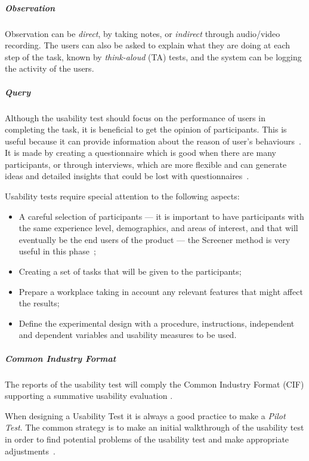 \documentclass[a4paper]{article}
\begin{document}
\subparagraph{Observation} Observation can be \emph{direct}, by taking notes, or \emph{indirect} through audio/video recording. The users can also be asked to explain what they are doing at each step of the task, known by \emph{think-aloud} (TA) tests, and the system can be logging the activity of the users.
  
\subparagraph{Query} Although the usability test should focus on the performance of users in completing the task, it is beneficial to get the opinion of participants. This is useful because it can provide information about the reason of user's behaviours~\citep{mitchell2007step}. It is made by creating a questionnaire which is good when there are many participants, or through interviews, which are more flexible and can generate ideas and detailed insights that could be lost with questionnaires~\citep{lazar2010research}.

Usability tests require special attention to the following aspects:
\begin{itemize}
\item A careful selection of participants --- it is important to have participants with the same experience level, demographics, and areas of interest, and that will eventually be the end users of the product --- the Screener method is very useful in this phase~\citep{mitchell2007step};
\item Creating a set of tasks that will be given to the participants;
\item Prepare a workplace taking in account any relevant features that might affect the results;
\item Define the experimental design with a procedure, instructions, independent and dependent variables and usability measures to be used.
\end{itemize}

\subparagraph{Common Industry Format} The reports of the usability test will comply the Common Industry Format (CIF) supporting a summative usability evaluation \citep{iusr2006cif}.

When designing a Usability Test it is always a good practice to make a \emph{Pilot Test}. The common strategy is to make an initial walkthrough of the usability test in order to find potential problems of the usability test and make appropriate adjustments~\citep{lewis2006usability}.





\end{document}
